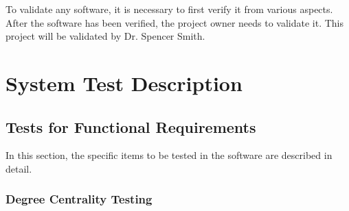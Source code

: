 \documentclass[12pt, titlepage]{article}
\begin{document}
To validate any software, it is necessary to first verify it from various aspects. After the software has been verified, the project owner needs to validate it. This project will be validated by Dr. Spencer Smith.

\section{System Test Description}
	
\subsection{Tests for Functional Requirements}
In this section, the specific items to be tested in the software are described in detail.


		



					
					
					
					
					


\subsubsection{Degree Centrality Testing}
\end{document}
